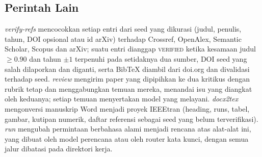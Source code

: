\subsection{Perintah Lain}
\emph{verify-refs} mencocokkan setiap entri dari seed yang dikurasi (judul, penulis, tahun, DOI opsional atau id arXiv) terhadap Crossref, OpenAlex, Semantic Scholar, Scopus dan arXiv; suatu entri dianggap \textsc{verified} ketika kesamaan judul $\ge0.90$ dan tahun $\pm1$ terpenuhi pada setidaknya dua sumber, DOI seed yang salah dilaporkan dan diganti, serta BibTeX diambil dari doi.org dan divalidasi terhadap seed. \emph{review} mengirim paper yang dipipihkan ke dua kritikus dengan rubrik tetap dan menggabungkan temuan mereka, menandai isu yang diangkat oleh keduanya; setiap temuan menyertakan model yang melayani. \emph{docx2tex} mengonversi manuskrip Word menjadi proyek IEEEtran (heading, runs, tabel, gambar, kutipan numerik, daftar referensi sebagai seed yang belum terverifikasi). \emph{run} mengubah permintaan berbahasa alami menjadi rencana atas alat-alat ini, yang dibuat oleh model perencana atau oleh router kata kunci, dengan semua jalur dibatasi pada direktori kerja.
